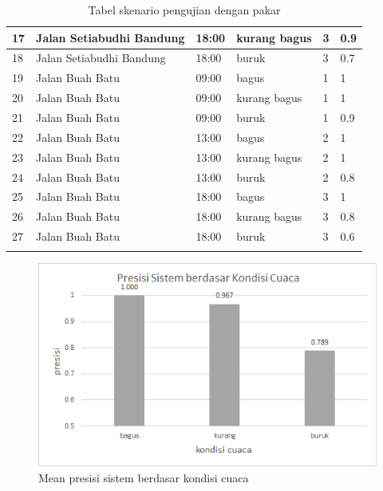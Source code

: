 \begin{center}
\begin{longtable}{ |l|l|l|l|l|l| }
\hline
17	&	Jalan Setiabudhi Bandung	&	18:00	& kurang bagus & 3 & 0.9\\
\hline
18	&	Jalan Setiabudhi Bandung	&	18:00	& buruk & 3 & 0.7\\
\hline
19	&	Jalan Buah Batu	&	09:00	& bagus & 1 & 1\\
\hline
20	&	Jalan Buah Batu	&	09:00	& kurang bagus & 1 & 1\\
\hline
21	&	Jalan Buah Batu	&	09:00	& buruk & 1 & 0.9\\
\hline
22	&	Jalan Buah Batu	&	13:00	& bagus & 2 & 1\\
\hline
23	&	Jalan Buah Batu	&	13:00	& kurang bagus & 2 & 1\\
\hline
24	&	Jalan Buah Batu	&	13:00	& buruk & 2 & 0.8\\
\hline
25	&	Jalan Buah Batu	&	18:00	& bagus & 3 & 1\\
\hline
26	&	Jalan Buah Batu	&	18:00	& kurang bagus & 3 & 0.8\\
\hline
27	&	Jalan Buah Batu	&	18:00	& buruk & 3 & 0.6\\
\hline
\caption{Tabel skenario pengujian dengan pakar}
\label{table:result-1}
\end{longtable}
\end{center}

\begin{figure}[h!]
    \centering
    \includegraphics[scale=0.7]{img/precision_weather.png}
    \caption{Mean presisi sistem berdasar kondisi cuaca}
    \label{fig:p_weather}
\end{figure}


